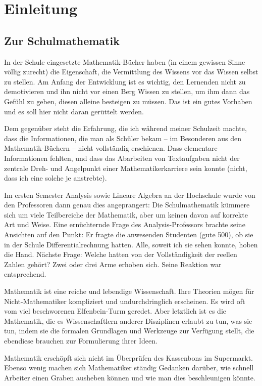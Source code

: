 \chapter{Einleitung}

\section{Zur Schulmathematik}

In der Schule eingesetzte Mathematik-Bücher haben (in einem gewissen Sinne völlig zurecht) die Eigenschaft, die Vermittlung des Wissens vor das Wissen selbst zu stellen. Am Anfang der Entwicklung ist es wichtig, den Lernenden nicht zu demotivieren und ihn nicht vor einen Berg Wissen zu stellen, um ihm dann das Gefühl zu geben, diesen alleine besteigen zu müssen. Das ist ein gutes Vorhaben und es soll hier nicht daran gerüttelt werden. 

Dem gegenüber steht die Erfahrung, die ich während meiner Schulzeit machte, dass die Informationen, die man als Schüler bekam -- im Besonderen aus den Mathematik-Büchern -- nicht vollständig erschienen. Dass elementare Informationen fehlten, und dass das Abarbeiten von Textaufgaben nicht der zentrale Dreh- und Angelpunkt einer Mathematikerkarriere sein konnte (nicht, dass ich eine solche je anstrebte).

Im ersten Semester Analysis sowie Lineare Algebra an der Hochschule wurde von den Professoren dann genau dies angeprangert: Die Schulmathematik kümmere sich um viele Teilbereiche der Mathematik, aber um keinen davon auf korrekte Art und Weise. Eine ernüchternde Frage des Analysis-Professors brachte seine Ansichten auf den Punkt: Er fragte die anwesenden Studenten (gute 500), ob sie in der Schule Differentialrechnung hatten. Alle, soweit ich sie sehen konnte, hoben die Hand. Nächste Frage: Welche hatten von der Vollständigkeit der reellen Zahlen gehört? Zwei oder drei Arme erhoben sich. Seine Reaktion war entsprechend. 

Mathematik ist eine reiche und lebendige Wissenschaft. Ihre Theorien mögen für Nicht-Mathematiker kompliziert und undurchdringlich erscheinen. Es wird oft vom viel beschworenen Elfenbein-Turm geredet. Aber letztlich ist es die Mathematik, die es Wissenschaftlern anderer Disziplinen erlaubt zu tun, was sie tun, indem sie die formalen Grundlagen und Werkzeuge zur Verfügung stellt, die ebendiese brauchen zur Formulierung ihrer Ideen.

Mathematik erschöpft sich nicht im Überprüfen des Kassenbons im Supermarkt. Ebenso wenig machen sich Mathematiker ständig Gedanken darüber, wie schnell Arbeiter einen Graben ausheben können und wie man dies beschleunigen könnte. 

